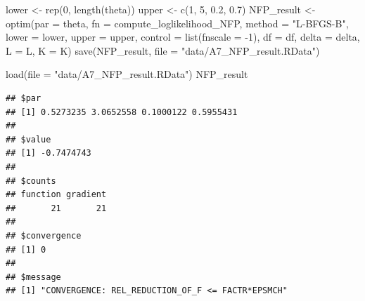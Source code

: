 \documentclass[
]{book}
\newenvironment{Shaded}{\begin{snugshade}}{\end{snugshade}}
\newcommand{\AttributeTok}[1]{\textcolor[rgb]{0.77,0.63,0.00}{#1}}
\newcommand{\DecValTok}[1]{\textcolor[rgb]{0.00,0.00,0.81}{#1}}
\newcommand{\FloatTok}[1]{\textcolor[rgb]{0.00,0.00,0.81}{#1}}
\newcommand{\FunctionTok}[1]{\textcolor[rgb]{0.00,0.00,0.00}{#1}}
\newcommand{\NormalTok}[1]{#1}
\newcommand{\OtherTok}[1]{\textcolor[rgb]{0.56,0.35,0.01}{#1}}
\newcommand{\SpecialCharTok}[1]{\textcolor[rgb]{0.00,0.00,0.00}{#1}}
\newcommand{\StringTok}[1]{\textcolor[rgb]{0.31,0.60,0.02}{#1}}
\begin{document}
\begin{Shaded}
\begin{Highlighting}[]
\NormalTok{lower }\OtherTok{\textless{}{-}} \FunctionTok{rep}\NormalTok{(}\DecValTok{0}\NormalTok{, }\FunctionTok{length}\NormalTok{(theta))}
\NormalTok{upper }\OtherTok{\textless{}{-}} \FunctionTok{c}\NormalTok{(}\DecValTok{1}\NormalTok{, }\DecValTok{5}\NormalTok{, }\FloatTok{0.2}\NormalTok{, }\FloatTok{0.7}\NormalTok{)}
\NormalTok{NFP\_result }\OtherTok{\textless{}{-}}
  \FunctionTok{optim}\NormalTok{(}\AttributeTok{par =}\NormalTok{ theta,}
        \AttributeTok{fn =}\NormalTok{ compute\_loglikelihood\_NFP,}
        \AttributeTok{method =} \StringTok{"L{-}BFGS{-}B"}\NormalTok{,}
        \AttributeTok{lower =}\NormalTok{ lower,}
        \AttributeTok{upper =}\NormalTok{ upper,}
        \AttributeTok{control =} \FunctionTok{list}\NormalTok{(}\AttributeTok{fnscale =} \SpecialCharTok{{-}}\DecValTok{1}\NormalTok{),}
        \AttributeTok{df =}\NormalTok{ df, }
        \AttributeTok{delta =}\NormalTok{ delta,}
        \AttributeTok{L =}\NormalTok{ L,}
        \AttributeTok{K =}\NormalTok{ K)}
\FunctionTok{save}\NormalTok{(NFP\_result, }\AttributeTok{file =} \StringTok{"data/A7\_NFP\_result.RData"}\NormalTok{)}
\end{Highlighting}
\end{Shaded}

\begin{Shaded}
\begin{Highlighting}[]
\FunctionTok{load}\NormalTok{(}\AttributeTok{file =} \StringTok{"data/A7\_NFP\_result.RData"}\NormalTok{)}
\NormalTok{NFP\_result}
\end{Highlighting}
\end{Shaded}

\begin{verbatim}
## $par
## [1] 0.5273235 3.0652558 0.1000122 0.5955431
## 
## $value
## [1] -0.7474743
## 
## $counts
## function gradient 
##       21       21 
## 
## $convergence
## [1] 0
## 
## $message
## [1] "CONVERGENCE: REL_REDUCTION_OF_F <= FACTR*EPSMCH"
\end{verbatim}

\begin{Shaded}
\end{Shaded}
\end{document}
